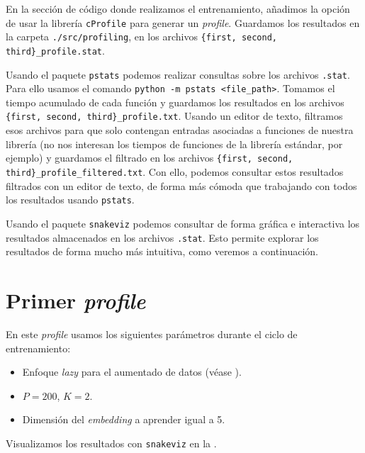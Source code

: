 En la sección de código donde realizamos el entrenamiento, añadimos la opción de usar la librería \lstinline{cProfile} para generar un \textit{profile}. Guardamos los resultados en la carpeta \lstinline{./src/profiling}, en los archivos \lstinline|{first, second, third}_profile.stat|.

Usando el paquete \lstinline{pstats} podemos realizar consultas sobre los archivos \lstinline{.stat}. Para ello usamos el comando \lstinline{python -m pstats <file_path>}. Tomamos el tiempo acumulado de cada función y guardamos los resultados en los archivos \lstinline|{first, second, third}_profile.txt|. Usando un editor de texto, filtramos esos archivos para que solo contengan entradas asociadas a funciones de nuestra librería (no nos interesan los tiempos de funciones de la librería estándar, por ejemplo) y guardamos el filtrado en los archivos \lstinline|{first, second, third}_profile_filtered.txt|. Con ello, podemos consultar estos resultados filtrados con un editor de texto, de forma más cómoda que trabajando con todos los resultados usando \lstinline{pstats}.

Usando el paquete \lstinline{snakeviz} podemos consultar de forma gráfica e interactiva los resultados almacenados en los archivos \lstinline{.stat}. Esto permite explorar los resultados de forma mucho más intuitiva, como veremos a continuación.

\section{Primer \textit{profile}}

En este \textit{profile} usamos los siguientes parámetros durante el ciclo de entrenamiento:

\begin{itemize}
	\item Enfoque \textit{lazy} para el aumentado de datos (véase ).
	\item $P = 200$, $K = 2$.
	\item Dimensión del \textit{embedding} a aprender igual a 5.
\end{itemize}

Visualizamos los resultados con \lstinline{snakeviz} en la .

